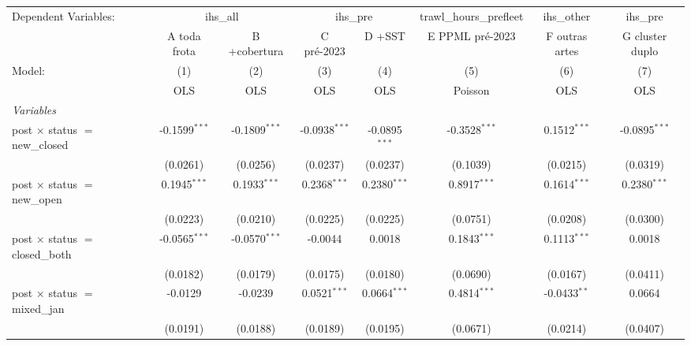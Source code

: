 
\begingroup
\centering
\begin{tabular}{lccccccc}
   \tabularnewline \midrule \midrule
   Dependent Variables: & \multicolumn{2}{c}{ihs\_all} & \multicolumn{2}{c}{ihs\_pre} & trawl\_hours\_prefleet & ihs\_other & ihs\_pre\\
                                           & A toda frota    & B +cobertura    & C pré-2023      & D +SST          & E PPML pré-2023 & F outras artes  & G cluster duplo \\   
   Model:                                  & (1)             & (2)             & (3)             & (4)             & (5)             & (6)             & (7)\\  
                                           &  OLS            & OLS             & OLS             & OLS             & Poisson         & OLS             & OLS\\  
   \midrule
   \emph{Variables}\\
   post $\times$ status $=$ new\_closed    & -0.1599$^{***}$ & -0.1809$^{***}$ & -0.0938$^{***}$ & -0.0895$^{***}$ & -0.3528$^{***}$ & 0.1512$^{***}$  & -0.0895$^{***}$\\   
                                           & (0.0261)        & (0.0256)        & (0.0237)        & (0.0237)        & (0.1039)        & (0.0215)        & (0.0319)\\   
   post $\times$ status $=$ new\_open      & 0.1945$^{***}$  & 0.1933$^{***}$  & 0.2368$^{***}$  & 0.2380$^{***}$  & 0.8917$^{***}$  & 0.1614$^{***}$  & 0.2380$^{***}$\\   
                                           & (0.0223)        & (0.0210)        & (0.0225)        & (0.0225)        & (0.0751)        & (0.0208)        & (0.0300)\\   
   post $\times$ status $=$ closed\_both   & -0.0565$^{***}$ & -0.0570$^{***}$ & -0.0044         & 0.0018          & 0.1843$^{***}$  & 0.1113$^{***}$  & 0.0018\\   
                                           & (0.0182)        & (0.0179)        & (0.0175)        & (0.0180)        & (0.0690)        & (0.0167)        & (0.0411)\\   
   post $\times$ status $=$ mixed\_jan     & -0.0129         & -0.0239         & 0.0521$^{***}$  & 0.0664$^{***}$  & 0.4814$^{***}$  & -0.0433$^{**}$  & 0.0664\\   
                                           & (0.0191)        & (0.0188)        & (0.0189)        & (0.0195)        & (0.0671)        & (0.0214)        & (0.0407)\\   

\end{tabular}

